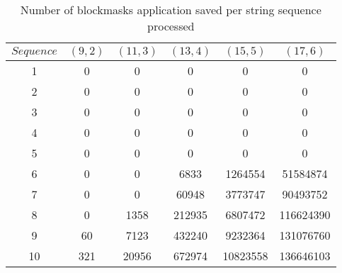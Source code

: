 \begin{table}[h] %
	\renewcommand{\arraystretch}{1.3}
	\centering
	\begin{tabular}{|c|c|c|c|c|c|}
		\hline 
		\bfseries\boldmath $Sequence$ & 
		\bfseries\boldmath $(9,2)$ & 
		\bfseries\boldmath $(11,3)$ & 
		\bfseries\boldmath $(13,4)$ & 
		\bfseries\boldmath $(15,5)$ & 
		\bfseries\boldmath $(17,6)$ \\
		\hline
			1	& 	0		& 	0		& 	0		&	0			& 	0\\
			2	& 	0		& 	0		& 	0		&	0 			& 	0\\
			3	& 	0		& 	0		& 	0		&	0 			& 	0\\
			4	& 	0		& 	0		& 	0 		&	0 			& 	0\\
			5	& 	0		& 	0 		&	0		&	0			&	0\\
			6	& 	0		& 	0		& 	6833	&	1264554		&	51584874\\
			7	& 	0		& 	0   	& 	60948	&	3773747		&	90493752\\
			8	& 	0	 	&	1358	& 	212935	&	6807472		&	116624390\\
			9	& 	60	 	& 	7123	& 	432240	&	9232364		&	131076760\\
			10	& 	321 	&	20956	& 	672974	&	10823558	&	136646103\\
		\hline\end{tabular}
		
		\caption{Number of blockmasks application saved per string sequence processed}
		\label{tbl:blockmask_save}
\end{table}